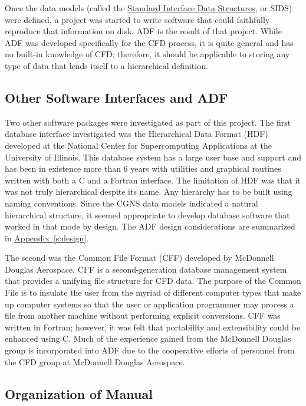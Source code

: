 Once the data models (called the \href{../sids/sids.pdf}{Standard
Interface Data Structures}, or SIDS) were defined, a project was started
to write software that could faithfully reproduce that information on
disk.
ADF is the result of that project.
While ADF was developed specifically for the CFD process, it is quite
general and has no built-in knowledge of CFD; therefore, it should
be applicable to storing any type of data that lends itself to a
hierarchical definition.

\subsection{Other Software Interfaces and ADF}

Two other software packages were investigated as part of this project.
The first database interface investigated was the
Hierarchical Data Format (HDF)
developed at the National Center for
Supercomputing Applications at the University of Illinois.
This database system has a large user base and support and has been
in existence more than 6 years with utilities and graphical routines
written with both a C and a Fortran interface.
The limitation of HDF was that it was not truly hierarchical despite its
name.
Any hierarchy has to be built using naming conventions.
Since the CGNS data models indicated a natural hierarchical structure,
it seemed appropriate to develop database software that worked in that
mode by design.
The ADF design considerations are summarized in
\hyperref[s:design]{Appendix~\ref*{s:design}}.

The second was the
Common File Format
(CFF) developed by McDonnell Douglas Aerospace.
CFF is a second-generation database management system that provides a
unifying file structure for CFD data.
The purpose of the Common File is to insulate the user from the myriad
of different computer types that make up computer systems so that the
user or application programmer may process a file from another machine
without performing explicit conversions.
CFF was written in Fortran; however, it was felt that portability and
extensibility could be enhanced using C.
Much of the experience gained from the McDonnell Douglas group is
incorporated into ADF due to the cooperative efforts of personnel from
the CFD group at McDonnell Douglas Aerospace.

\subsection{Organization of Manual}

